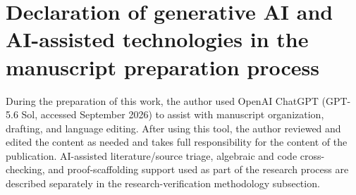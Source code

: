 \section*{Declaration of generative AI and AI-assisted technologies in the manuscript preparation process}

During the preparation of this work, the author used OpenAI ChatGPT (GPT-5.6 Sol, accessed September 2026) to assist with manuscript organization, drafting, and language editing.  After using this tool, the author reviewed and edited the content as needed and takes full responsibility for the content of the publication.  AI-assisted literature/source triage, algebraic and code cross-checking, and proof-scaffolding support used as part of the research process are described separately in the research-verification methodology subsection.
